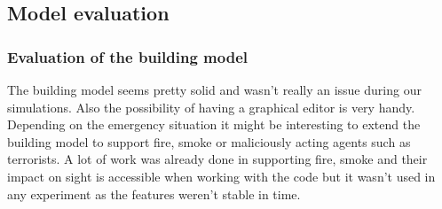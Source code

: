 \documentclass[11pt]{article}
\begin{document}
%
%    
%
%
%
\subsection{Model evaluation}

\subsubsection{Evaluation of the building model}
The building model seems pretty solid and wasn't really an issue during our simulations. Also the possibility of having a graphical editor is very handy. Depending on the emergency situation it might be interesting to extend the building model to support fire, smoke or maliciously acting agents such as terrorists. A lot of work was already done in supporting fire, smoke and their impact on sight is accessible when working with the code but it wasn't used in any experiment as the features weren't stable in time.
\end{document}
